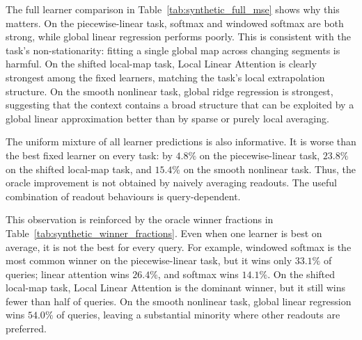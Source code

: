 The full learner comparison in Table~\ref{tab:synthetic_full_mse} shows why this matters. On the piecewise-linear task, softmax and windowed softmax are both strong, while global linear regression performs poorly. This is consistent with the task's non-stationarity: fitting a single global map across changing segments is harmful. On the shifted local-map task, Local Linear Attention is clearly strongest among the fixed learners, matching the task's local extrapolation structure. On the smooth nonlinear task, global ridge regression is strongest, suggesting that the context contains a broad structure that can be exploited by a global linear approximation better than by sparse or purely local averaging.

\begin{table}[t]
\centering
\small
{}
\caption{Mean MSE of fixed readout rules on synthetic tasks. Each learner receives the same query, context keys, and context values; only the readout rule differs. Lower is better.}\label{tab:synthetic_full_mse}
\end{table}

The uniform mixture of all learner predictions is also informative. It is worse than the best fixed learner on every task: by \(4.8\%\) on the piecewise-linear task, \(23.8\%\) on the shifted local-map task, and \(15.4\%\) on the smooth nonlinear task. Thus, the oracle improvement is not obtained by naively averaging readouts. The useful combination of readout behaviours is query-dependent.

This observation is reinforced by the oracle winner fractions in Table~\ref{tab:synthetic_winner_fractions}. Even when one learner is best on average, it is not the best for every query. For example, windowed softmax is the most common winner on the piecewise-linear task, but it wins only \(33.1\%\) of queries; linear attention wins \(26.4\%\), and softmax wins \(14.1\%\). On the shifted local-map task, Local Linear Attention is the dominant winner, but it still wins fewer than half of queries. On the smooth nonlinear task, global linear regression wins \(54.0\%\) of queries, leaving a substantial minority where other readouts are preferred.

